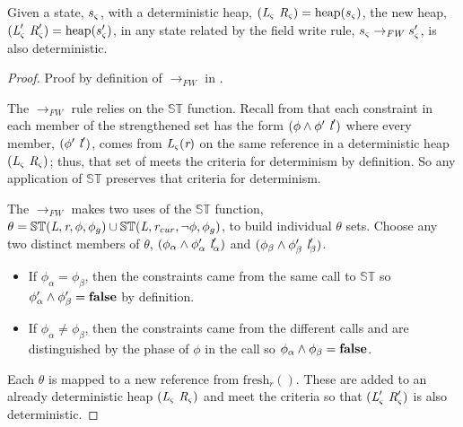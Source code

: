 \begin{lemma}
\label{lem:FW-determ}
Given a state, $s_{\varsigma}$, with a deterministic heap,
$(\emph{L}_{\varsigma}\ \emph{R}_{\varsigma}) =
\mathrm{heap}(s_{\varsigma})$, the new heap,
$(\emph{L}_{\varsigma}^\prime\ \emph{R}_{\varsigma}^\prime) =
\mathrm{heap}(s_{\varsigma}^\prime)$, in any state related by the field
write rule, $s_{\varsigma} \rightarrow_\mathit{FW} s_{\varsigma}^\prime$,
is also deterministic.
\end{lemma}
\begin{proof}
Proof by definition of $\rightarrow_\mathit{FW}$ in .

The $\rightarrow_\mathit{FW}$ rule relies on the $\mathbb{ST}$
function. Recall from  that each constraint in each
member of the strengthened set has the form $(\phi\wedge
\phi^\prime\ \emph{l}^\prime)$ where every member,
$(\phi^\prime\ \emph{l}^\prime)$, comes from
$\emph{L}_{\varsigma}(\emph{r})$ on the same reference in a
deterministic heap $(\emph{L}_{\varsigma}\ \emph{R}_{\varsigma})$; thus,
that set of meets the criteria for determinism by definition. So any
application of $\mathbb{ST}$ preserves that criteria for determinism.

The $\rightarrow_\mathit{FW}$ makes two uses of the $\mathbb{ST}$
function, $\theta = \mathbb{ST}(\emph{L},\emph{r},\phi,\phi_g) \cup
\mathbb{ST}(\emph{L},\emph{r}_\mathit{cur},\neg\phi,\phi_g)$, to
build individual $\theta$ sets. Choose any two distinct members of $\theta$,
$(\phi_\alpha \wedge \phi_\alpha^\prime\ \cfgnt{l}_\alpha^\prime)$ and
$(\phi_\beta \wedge \phi_\beta^\prime\ \cfgnt{l}_\beta^\prime)$.
\begin{itemize}
\item If $\phi_\alpha = \phi_\beta$, then the constraints came from the
  same call to $\mathbb{ST}$ so $\phi_\alpha^\prime \wedge
  \phi_\beta^\prime = \textbf{false}$ by definition.
\item If $\phi_\alpha \ne \phi_\beta$, then the constraints came from
  the different calls and are distinguished by the phase of $\phi$ in
  the call so $\phi_\alpha \wedge \phi_\beta = \textbf{false}$.
\end{itemize}
Each $\theta$ is mapped to a new reference from
$\mathrm{fresh}_r()$. These are added to an already deterministic heap
$(\emph{L}_{\varsigma}\ \emph{R}_{\varsigma})$ and meet the criteria so
that $(\cfgnt{L}_\sym^\prime\ \cfgnt{R}_\sym^\prime)$ is also
deterministic.
\end{proof}

